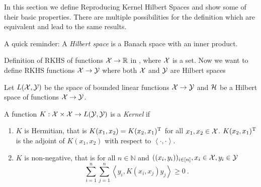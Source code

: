 In this section we define Reproducing Kernel Hilbert Spaces and show some of their basic properties.
There are multiple possibilities for the definition which are equivalent and lead to the same results.

A quick reminder: A \emph{Hilbert space} is a Banach space with an inner product.

Definition of RKHS of functions $\mathcal{X} \rightarrow \mathbb{R}$ in \cite{sejdinovic12}, where $\mathcal{X}$ is a set.
Now we want to define RKHS functions $\mathcal{X} \rightarrow \mathcal{Y}$ where both $\mathcal{X}$ and $\mathcal{Y}$ are Hilbert spaces 

Let $L(\mathcal{X}, \mathcal{Y})$ be the space of bounded linear functions $\mathcal{X} \rightarrow \mathcal{Y}$ and $\mathcal{H}$ be a Hilbert space of functions $\mathcal{X} \rightarrow \mathcal{Y}$.

\begin{definition}
	\label{def:kernel}
	A function $K: \mathcal{X} \times \mathcal{X} \rightarrow L(\mathcal{Y}, \mathcal{Y})$ is a \emph{Kernel} if
	\begin{enumerate}
		\item $K$ is Hermitian, that is $K(x_1, x_2) = K(x_2, x_1)^{\mathrm{T}}$ for all $x_1, x_2 \in \mathcal{X}$. 
		$K(x_2, x_1)^{\mathrm{T}}$ is the adjoint of $K(x_1, x_2)$ with respect to $\left<\cdot, \cdot\right>$.
		\item $K$ is non-negative, that is for all $n \in \mathbb{N}$ and $((x_i, y_i))_{i \in [n]}, x_i \in \mathcal{X}, y_i \in \mathcal{Y}$
		\begin{equation}
			\sum_{i=1}^n \sum_{j=1}^n \left< y_i, K(x_i, x_j)  y_j\right> \geq 0 \ .
		\end{equation}
	\end{enumerate}
\end{definition}


